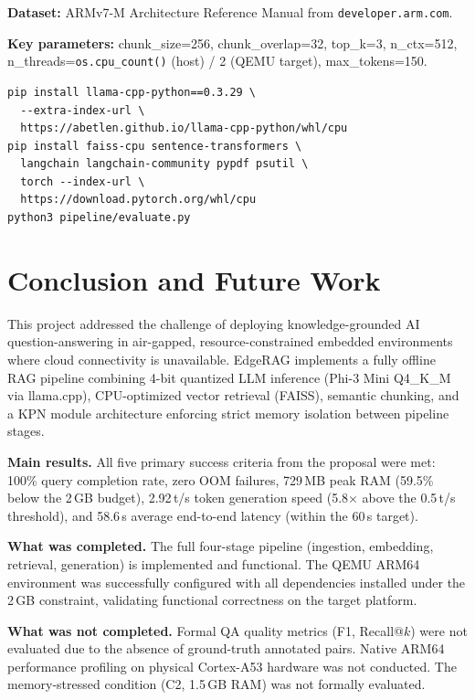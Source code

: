 \documentclass[10pt,twocolumn]{article}
\begin{document}
\textbf{Dataset:} ARMv7-M Architecture Reference Manual from
\texttt{developer.arm.com}.

\textbf{Key parameters:} chunk\_size=256, chunk\_overlap=32, top\_k=3,
n\_ctx=512, n\_threads=\texttt{os.cpu\_count()} (host) / 2 (QEMU target),
max\_tokens=150.

\begin{verbatim}
pip install llama-cpp-python==0.3.29 \
  --extra-index-url \
  https://abetlen.github.io/llama-cpp-python/whl/cpu
pip install faiss-cpu sentence-transformers \
  langchain langchain-community pypdf psutil \
  torch --index-url \
  https://download.pytorch.org/whl/cpu
python3 pipeline/evaluate.py
\end{verbatim}

\section{Conclusion and Future Work}
\label{sec:conclusion}

This project addressed the challenge of deploying knowledge-grounded AI
question-answering in air-gapped, resource-constrained embedded environments
where cloud connectivity is unavailable. EdgeRAG implements a fully offline
RAG pipeline combining 4-bit quantized LLM inference (Phi-3 Mini Q4\_K\_M
via llama.cpp), CPU-optimized vector retrieval (FAISS), semantic chunking,
and a KPN module architecture enforcing strict memory isolation between
pipeline stages.

\textbf{Main results.} All five primary success criteria from the proposal
were met: 100\% query completion rate, zero OOM failures, 729\,MB peak RAM
(59.5\% below the 2\,GB budget), 2.92\,t/s token generation speed (5.8$\times$
above the 0.5\,t/s threshold), and 58.6\,s average end-to-end latency
(within the 60\,s target).

\textbf{What was completed.} The full four-stage pipeline (ingestion, embedding,
retrieval, generation) is implemented and functional. The QEMU ARM64
environment was successfully configured with all dependencies installed under
the 2\,GB constraint, validating functional correctness on the target platform.

\textbf{What was not completed.} Formal QA quality metrics (F1, Recall@$k$)
were not evaluated due to the absence of ground-truth annotated pairs.
Native ARM64 performance profiling on physical Cortex-A53 hardware was not
conducted. The memory-stressed condition (C2, 1.5\,GB RAM) was not formally
evaluated.
\end{document}
